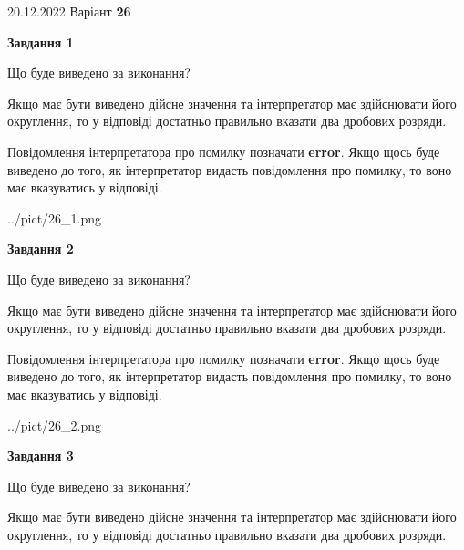 \documentclass[12pt, ukrainian]{article}
\begin{document}
{20.12.2022 Варіант \No \textbf { 26 }\par}
{
\begin {Large}

{\begin {center}\textbf{Завдання 1}\end {center}}\par
Що буде виведено за виконання? \par

Якщо має бути виведено дійсне значення та інтерпретатор має здійснювати його округлення, 
то у відповіді достатньо правильно вказати два дробових розряди.

Повідомлення інтерпретатора про помилку позначати \textbf{error}.
Якщо щось буде виведено до того, як інтерпретатор видасть повідомлення про помилку, 
то воно має вказуватись у відповіді. \par

\begin{center}
	{../pict/26_1.png}
\end{center}
\newpage

{\begin {center}\textbf{Завдання 2}\end {center}}\par
Що буде виведено за виконання? \par

Якщо має бути виведено дійсне значення та інтерпретатор має здійснювати його округлення, 
то у відповіді достатньо правильно вказати два дробових розряди.

Повідомлення інтерпретатора про помилку позначати \textbf{error}.
Якщо щось буде виведено до того, як інтерпретатор видасть повідомлення про помилку, 
то воно має вказуватись у відповіді. \par

\begin{center}
	{../pict/26_2.png}
\end{center}
\newpage

{\begin {center}\textbf{Завдання 3}\end {center}}\par
Що буде виведено за виконання? \par

Якщо має бути виведено дійсне значення та інтерпретатор має здійснювати його округлення, 
то у відповіді достатньо правильно вказати два дробових розряди.


\end{Large}}
\end{document}
